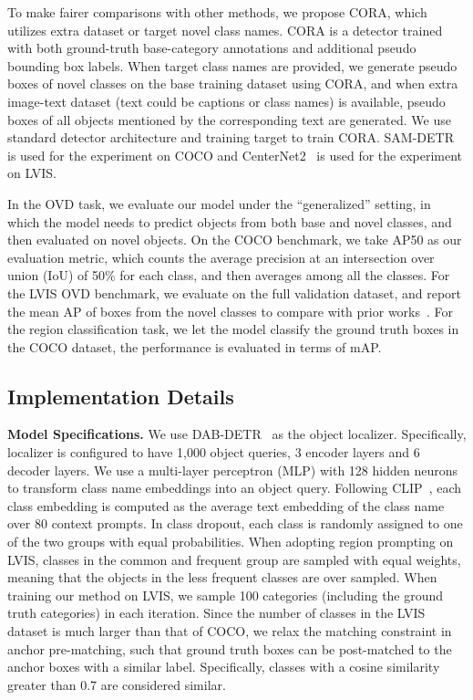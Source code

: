 \documentclass[10pt,twocolumn,letterpaper]{article}
\begin{document}
To make fairer comparisons with other methods, we propose CORA, which utilizes extra dataset or target novel class names.
CORA is a detector trained with both ground-truth base-category annotations and additional pseudo bounding box labels. When target class names are provided, we generate pseudo boxes of novel classes on the base training dataset using CORA, and when extra image-text dataset (text could be captions or class names) is available, 
pseudo boxes of all objects mentioned by the corresponding text are generated.
We use standard detector architecture and training target to train CORA.
SAM-DETR~\cite{SAMDETR} is used for the experiment on COCO and CenterNet2~\cite{centernet2} is used for the experiment on LVIS.

In the OVD task, we evaluate our model under the ``generalized'' setting, in which the model needs to predict objects from both base and novel classes, and then evaluated on novel objects.
On the COCO benchmark, we take AP50 as our evaluation metric, which counts the average precision at an intersection over union (IoU) of 50\% for each class, and then averages among all the classes.
For the LVIS OVD benchmark, we evaluate on the full validation dataset, and report the mean AP of boxes from the novel classes to compare with prior works~\cite{regionclip}. 
For the region classification task, we let the model classify the ground truth boxes in the COCO dataset, the performance is evaluated in terms of mAP.

\subsection{Implementation Details}
\label{sec:implementation}


\noindent\textbf{Model Specifications.} We use DAB-DETR~\cite{dabdetr} as the object localizer.
Specifically, localizer is configured to have 1,000 object queries, 3 encoder layers and 6 decoder layers.
We use a multi-layer perceptron (MLP) with 128 hidden neurons to transform class name embeddings into an object query. 
Following CLIP~\cite{clip}, each class embedding is computed as the average text embedding of the class name over 80 context prompts.
In class dropout, each class is randomly assigned to one of the two groups with equal probabilities.
When adopting region prompting on LVIS, classes in the common and frequent group are sampled with equal weights, meaning that the objects in the less frequent classes are over sampled.
When training our method on LVIS, we sample 100 categories (including the ground truth categories) in each iteration.
Since the number of classes in the LVIS dataset is much larger than that of COCO, we relax the matching constraint in anchor pre-matching, such that ground truth boxes can be post-matched to the anchor boxes with a similar label.
Specifically, classes with a cosine similarity greater than 0.7 are considered similar.
\end{document}
